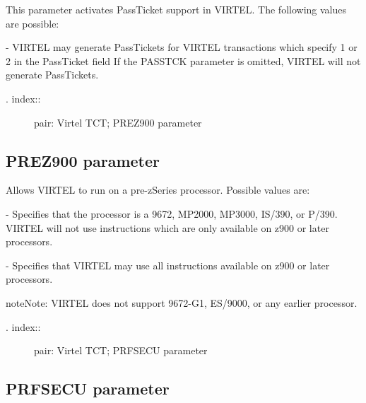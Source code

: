 \documentclass[letterpaper,10pt,english]{sphinxmanual}
\begin{document}
This parameter activates PassTicket support in VIRTEL. The following values are possible:

 - VIRTEL may generate PassTickets for VIRTEL transactions which specify 1 or 2 in the PassTicket field If the PASSTCK parameter is omitted, VIRTEL will not generate PassTickets.
\begin{description}
\item[{. index::}] \leavevmode
pair: Virtel TCT; PREZ900 parameter

\end{description}


\subsection{PREZ900 parameter}
\label{\detokenize{Installation_Guide:prez900-parameter}}
\begin{sphinxVerbatim}[commandchars=\\\{\}]
 
\end{sphinxVerbatim}

Allows VIRTEL to run on a pre-zSeries processor. Possible values are:

 - Specifies that the processor is a 9672, MP2000, MP3000, IS/390, or P/390. VIRTEL will not use instructions which are only available on z900 or later processors.

 - Specifies that VIRTEL may use all instructions available on z900 or later processors.

\begin{sphinxadmonition}{note}{Note:}
VIRTEL does not support 9672-G1, ES/9000, or any earlier processor.
\end{sphinxadmonition}
\begin{description}
\item[{. index::}] \leavevmode
pair: Virtel TCT; PRFSECU parameter

\end{description}


\subsection{PRFSECU parameter}
\label{\detokenize{Installation_Guide:prfsecu-parameter}}
\begin{sphinxVerbatim}[commandchars=\\\{\}]
 
\end{sphinxVerbatim}
\end{document}
